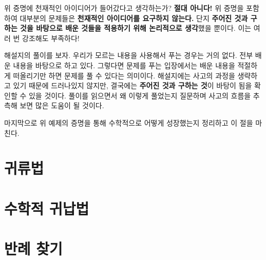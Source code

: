 위 증명에 천재적인 아이디어가 들어갔다고 생각하는가? \textbf{절대 아니다!} 위 증명을 포함하여 대부분의 문제들은 \textbf{천재적인 아이디어를 요구하지 않는다.} 단지 \textbf{주어진 것과 구하는 것을 바탕으로 배운 것들을 적용하기 위해 논리적으로 생각}했을 뿐이다. 이는 여러 번 강조해도 부족하다!

해설지의 풀이를 보자. 우리가 모르는 내용을 사용해서 푸는 경우는 거의 없다. 전부 배운 내용을 바탕으로 하고 있다. 그렇다면 문제를 푸는 입장에서는 배운 내용을 적절하게 떠올리기만 하면 문제를 풀 수 있다는 의미이다. 해설지에는 사고의 과정을 생략하고 있기 때문에 드러나있지 않지만, 결국에는 \textbf{주어진 것과 구하는 것}이 바탕이 됨을 확인할 수 있을 것이다. 풀이를 읽으면서 왜 이렇게 풀었는지 질문하며 사고의 흐름을 추측해 보면 많은 도움이 될 것이다.

마지막으로 위 예제의 증명을 통해 수학적으로 어떻게 성장했는지 정리하고 이 절을 마친다.


\pagebreak







\section{귀류법}

\section{수학적 귀납법}

\section{반례 찾기}
